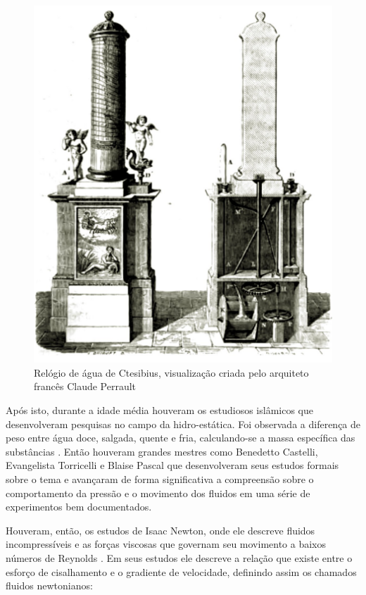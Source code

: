 \begin{figure}[htb]
	\begin{center}
    \includegraphics[scale=0.2]{ctesibius.jpeg}
	\end{center}
	\caption{\label{image:ctesibius} Relógio de água de Ctesibius, visualização criada pelo arquiteto francês Claude Perrault}
\end{figure}

Após isto, durante a idade média houveram os estudiosos islâmicos que desenvolveram pesquisas no campo da hidro-estática. Foi observada a diferença de peso entre água doce, salgada, quente e fria, calculando-se a massa específica das substâncias \cite{history_engeneering}. Então houveram grandes mestres como Benedetto Castelli, Evangelista Torricelli e Blaise Pascal que desenvolveram seus estudos formais sobre o tema e avançaram de forma significativa a compreensão sobre o comportamento da pressão e o movimento dos fluidos em uma série de experimentos bem documentados.

Houveram, então, os estudos de Isaac Newton, onde ele descreve fluidos incompressíveis e as forças viscosas que governam seu movimento a baixos números de Reynolds \cite{aristeu}. Em seus estudos ele descreve a relação que existe entre o esforço de cisalhamento e o gradiente de velocidade, definindo assim os chamados fluidos newtonianos:

